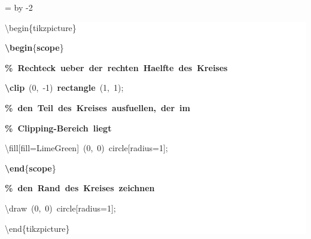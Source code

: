 \begingroup
\ttfamily
{}
=\textwidth
\advance{} by -2\fboxsep
\noindent
\colorbox{background}
{%
\parbox{\dimen255}
{%
\rule[-0.5ex]{0pt}{2.5ex}\hspace*{0.0em}\textbackslash{}begin\{tikzpicture\}\\
\rule[-0.5ex]{0pt}{2.5ex}\hspace*{1.0em}\textcolor{R}{\textbf{\textbackslash{}begin}}\{\textcolor{R}{\textbf{scope}}\}\\
\rule[-0.5ex]{0pt}{2.5ex}\hspace*{2.0em}\textcolor{G}{\textbf{\%~Rechteck~ueber~der~rechten~Haelfte~des~Kreises}}\\
\rule[-0.5ex]{0pt}{2.5ex}\hspace*{2.0em}\textcolor{R}{\textbf{\textbackslash{}clip}}~(0,~{-}1)~\textcolor{R}{\textbf{rectangle}}~(1,~1);\\
\rule[-0.5ex]{0pt}{2.5ex}\hspace*{2.0em}\textcolor{G}{\textbf{\%~den~Teil~des~Kreises~ausfuellen,~der~im}}\\
\rule[-0.5ex]{0pt}{2.5ex}\hspace*{2.0em}\textcolor{G}{\textbf{\%~Clipping{-}Bereich~liegt}}\\
\rule[-0.5ex]{0pt}{2.5ex}\hspace*{2.0em}\textbackslash{}fill[fill=LimeGreen]~(0,~0)~circle[radius=1];\\
\rule[-0.5ex]{0pt}{2.5ex}\hspace*{1.0em}\textcolor{R}{\textbf{\textbackslash{}end}}\{\textcolor{R}{\textbf{scope}}\}\\
\rule[-0.5ex]{0pt}{2.5ex}\hspace*{1.0em}\textcolor{G}{\textbf{\%~den~Rand~des~Kreises~zeichnen}}\\
\rule[-0.5ex]{0pt}{2.5ex}\hspace*{1.0em}\textbackslash{}draw~(0,~0)~circle[radius=1];\\
\rule[-0.5ex]{0pt}{2.5ex}\hspace*{0.0em}\textbackslash{}end\{tikzpicture\}}%
}%
\endgroup
